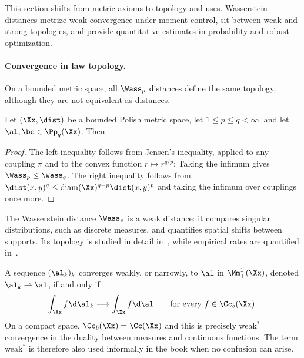 This section shifts from metric axioms to topology and uses. Wasserstein distances metrize weak convergence under moment control, sit between weak and strong topologies, and provide quantitative estimates in probability and robust optimization.

\paragraph{Convergence in law topology.}

On a bounded metric space, all $\Wass_p$ distances define the same topology, although they are not equivalent as distances.

\begin{prop}\label{prop-comp-wass-p}
		Let $(\Xx,\dist)$ be a bounded Polish metric space, let $1\leq p\leq q<\infty$, and let $\al,\be\in\Pp_q(\Xx)$. Then
\end{prop}
\begin{proof}
			The left inequality follows from Jensen's inequality, applied to any coupling $\pi$ and to the convex function $r\mapsto r^{q/p}$:
			Taking the infimum gives $\Wass_p\leq\Wass_q$. The right inequality follows from
			\(\dist(x,y)^q \leq \operatorname{diam}(\Xx)^{q-p} \dist(x,y)^p\)
			and taking the infimum over couplings once more.
		\end{proof}

The Wasserstein distance $\Wass_p$ is a weak distance: it compares singular distributions, such as discrete measures, and quantifies spatial shifts between supports. Its topology is studied in detail in~\cite{Villani09,SantambrogioBook,gigli2011user}, while empirical rates are quantified in~\cite{dudley1969speed,fournier2015rate,weed2017sharp,boissard2015distribution,bolley2007quantitative}.

\begin{defn}\label{dfn-weak-conv}
		A sequence $(\al_k)_k$ converges weakly, or narrowly, to $\al$ in $\Mm_+^1(\Xx)$, denoted $\al_k \rightharpoonup \al$, if and only if
		\[
			\int_\Xx f\d\al_k\longrightarrow\int_\Xx f\d\al
			\qquad\text{for every }f\in\Cc_b(\Xx).
		\]
		On a compact space, $\Cc_b(\Xx)=\Cc(\Xx)$ and this is precisely weak$^*$ convergence in the duality between measures and continuous functions. The term weak$^*$ is therefore also used informally in the book when no confusion can arise.
\end{defn}

